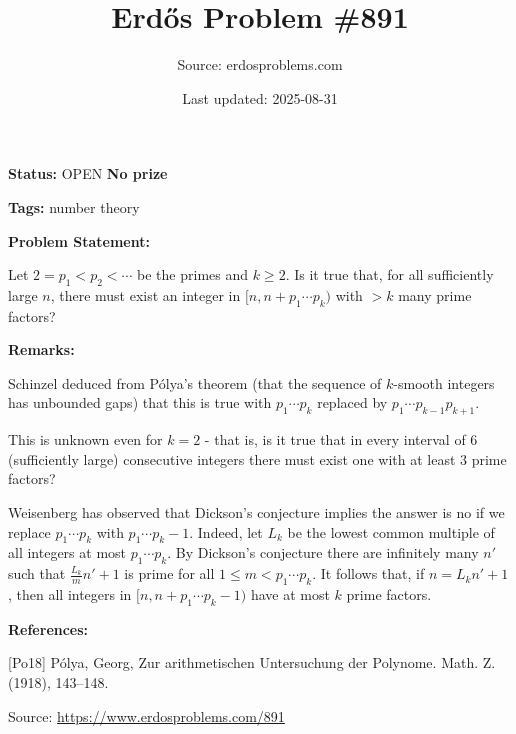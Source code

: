 \documentclass{article}
\title{Erd\H{o}s Problem \#891}
\date{Last updated: 2025-08-31}
\author{Source: erdosproblems.com}
\begin{document}
\maketitle

\noindent\textbf{Status:} OPEN \quad \textbf{No prize}

\noindent\textbf{Tags:} number theory

\medskip
\noindent\textbf{Problem Statement:}

Let $2=p_1<p_2<\cdots$ be the primes and $k\geq 2$. Is it true that, for all sufficiently large $n$, there must exist an integer in $[n,n+p_1\cdots p_k)$ with $>k$ many prime factors?

\bigskip
\noindent\textbf{Remarks:}

Schinzel deduced from P\'{o}lya's theorem \cite{Po18} (that the sequence of $k$-smooth integers has unbounded gaps) that this is true with $p_1\cdots p_k$ replaced by $p_1\cdots p_{k-1}p_{k+1}$. 

This is unknown even for $k=2$ - that is, is it true that in every interval of $6$ (sufficiently large) consecutive integers there must exist one with at least $3$ prime factors?

Weisenberg has observed that Dickson's conjecture implies the answer is no if we replace $p_1\cdots p_k$ with $p_1\cdots p_k-1$. Indeed, let $L_k$ be the lowest common multiple of all integers at most $p_1\cdots p_k$. By Dickson's conjecture there are infinitely many $n'$ such that $\frac{L_k}{m}n'+1$ is prime for all $1\leq m<p_1\cdots p_k$. It follows that, if $n=L_kn'+1$, then all integers in $[n,n+p_1\cdots p_k-1)$ have at most $k$ prime factors.

\bigskip
\noindent\textbf{References:}

[Po18] P\'{o}lya, Georg, Zur arithmetischen {U}ntersuchung der {P}olynome. Math. Z. (1918), 143--148.

\bigskip
\noindent\small{Source: \url{https://www.erdosproblems.com/891}}
\end{document}
